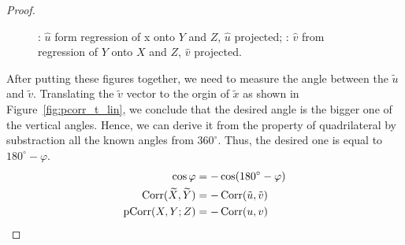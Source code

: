 \begin{proof}
\begin{figure}[ht!]
\begin{center}
\caption{: $\hat u$ form regression of x onto $Y$ and $Z$, $\hat u$ projected;
: $\hat v$ from regression of $Y$ onto $X$ and $Z$, $\hat v$ projected.}
\end{center}
\end{figure}


After putting these figures together, we need to measure the angle
between the $\tilde u$ and $\tilde v$.
Translating the $\tilde v$ vector to the orgin of $\tilde x$ as shown in Figure~\ref{fig:pcorr_t_lin},
we conclude that the desired angle is the bigger one of the vertical angles.
Hence, we can derive it from the property of quadrilateral
by substraction all the known angles from $360^\circ$.
Thus, the desired one is equal to $180^\circ - \varphi$.
\begin{align*}
\cos\varphi &= - \cos(180^\circ - \varphi) \\
\operatorname{Corr}(\widetilde X, \widetilde Y) &= -\operatorname{Corr}(\tilde u, \tilde v) \\
\operatorname{pCorr}(X,Y; Z) &= -\operatorname{Corr}(u, v)
\end{align*}



\end{proof}
